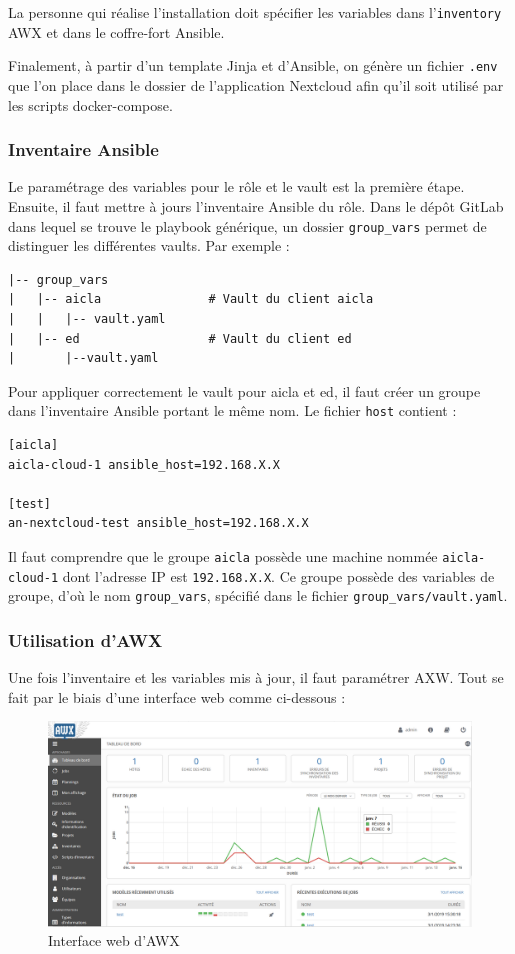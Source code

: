 \documentclass[12pt]{article}
\begin{document}
La personne qui réalise l'installation doit spécifier les variables dans l'\verb|inventory| AWX et dans le coffre-fort Ansible.

Finalement, à partir d'un template Jinja et d'Ansible, on génère un fichier \verb|.env| que l'on place dans le dossier de l'application Nextcloud afin qu'il soit utilisé par les scripts docker-compose.

\subsubsection{Inventaire Ansible}
Le paramétrage des variables pour le rôle et le vault est la première étape. Ensuite, il faut mettre à jours l'inventaire Ansible du rôle. Dans le dépôt GitLab dans lequel se trouve le playbook générique, un dossier \verb|group_vars| permet de distinguer les différentes vaults.
Par exemple :
\begin{verbatim}
|-- group_vars
|   |-- aicla               # Vault du client aicla
|   |   |-- vault.yaml
|   |-- ed                  # Vault du client ed
|       |--vault.yaml
\end{verbatim}

Pour appliquer correctement le vault pour aicla et ed, il faut créer un groupe dans l'inventaire Ansible portant le même nom. Le fichier \verb|host| contient :
\begin{verbatim}
[aicla]
aicla-cloud-1 ansible_host=192.168.X.X

[test]
an-nextcloud-test ansible_host=192.168.X.X
\end{verbatim}

Il faut comprendre que le groupe \verb|aicla| possède une machine nommée \verb|aicla-cloud-1| dont l'adresse IP est \verb|192.168.X.X|. Ce groupe possède des variables de groupe, d'où le nom \verb|group_vars|, spécifié dans le fichier \verb|group_vars/vault.yaml|.

\subsubsection{Utilisation d'AWX}
Une fois l'inventaire et les variables mis à jour, il faut paramétrer AXW. Tout se fait par le biais d'une interface web comme ci-dessous :
\begin{figure}[!ht]
    \centering
    \includegraphics[width=\textwidth]{src/awx.png}
    \caption{Interface web d'AWX}
    \label{fig:awx}
\end{figure}
\end{document}
